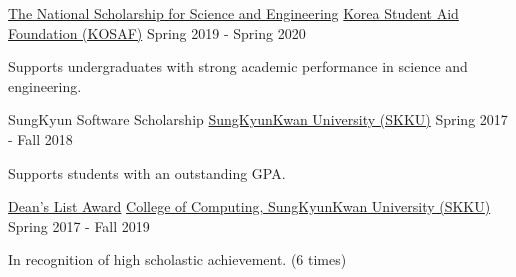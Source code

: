\documentclass[11pt, a4paper]{cv}
\begin{document}
\begin{cventries}

  \cvhonor
    {\href{https://www.kosaf.go.kr/eng/jsp/aid/aid02_01_01.jsp}{The National Scholarship for Science and Engineering}} %
    {\href{https://www.kosaf.go.kr/eng/jsp/main.jsp}{Korea Student Aid Foundation (KOSAF)}} %
    {Spring 2019 - Spring 2020} %
    {
      \begin{cvitems} %
        \item {Supports undergraduates with strong academic performance in science and engineering.}
      \end{cvitems}
    }

  \cvhonor
    {SungKyun Software Scholarship} %
    {\href{https://www.skku.edu/eng/}{SungKyunKwan University (SKKU)}} %
    {Spring 2017 - Fall 2018} %
    {
      \begin{cvitems} %
        \item {Supports students with an outstanding GPA.}
      \end{cvitems}
    }

  \cvhonor
    {\href{https://cs.skku.edu/en/edures/education/view/4137}{Dean's List Award}} %
    {\href{https://cs.skku.edu/en}{College of Computing, SungKyunKwan University (SKKU)}} %
    {Spring 2017 - Fall 2019} %
    {
      \begin{cvitems} %
        \item {In recognition of high scholastic achievement. (6 times)}
      \end{cvitems}
    }

\end{cventries}



\vspace{-2mm}
\end{document}
